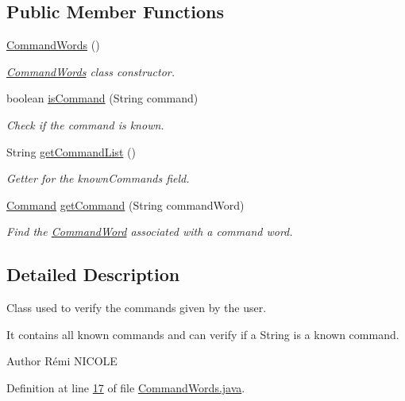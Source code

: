 \subsection*{Public Member Functions}
\begin{DoxyCompactItemize}
\item 
\hyperlink{classpkg__parsing_1_1CommandWords_ac01e3b4727e741eb8add2eef27c8f7b7}{Command\-Words} ()
\begin{DoxyCompactList}\small\item\em \hyperlink{classpkg__parsing_1_1CommandWords}{Command\-Words} class constructor. \end{DoxyCompactList}\item 
boolean \hyperlink{classpkg__parsing_1_1CommandWords_ab02b508bb42cbda758afe6cee5794216}{is\-Command} (String command)
\begin{DoxyCompactList}\small\item\em Check if the command is known. \end{DoxyCompactList}\item 
String \hyperlink{classpkg__parsing_1_1CommandWords_a55f01013b1d051547ee3fa6605ea4c14}{get\-Command\-List} ()
\begin{DoxyCompactList}\small\item\em Getter for the known\-Commands field. \end{DoxyCompactList}\item 
\hyperlink{classpkg__commands_1_1Command}{Command} \hyperlink{classpkg__parsing_1_1CommandWords_a244829164976aa9444b3b1e84462ac5c}{get\-Command} (String command\-Word)
\begin{DoxyCompactList}\small\item\em Find the \hyperlink{enumpkg__parsing_1_1CommandWord}{Command\-Word} associated with a command word. \end{DoxyCompactList}\end{DoxyCompactItemize}


\subsection{Detailed Description}
Class used to verify the commands given by the user. 

It contains all known commands and can verify if a String is a known command. \begin{DoxyAuthor}{Author}
Rémi N\-I\-C\-O\-L\-E 
\end{DoxyAuthor}


Definition at line \hyperlink{CommandWords_8java_source_l00017}{17} of file \hyperlink{CommandWords_8java_source}{Command\-Words.\-java}.




